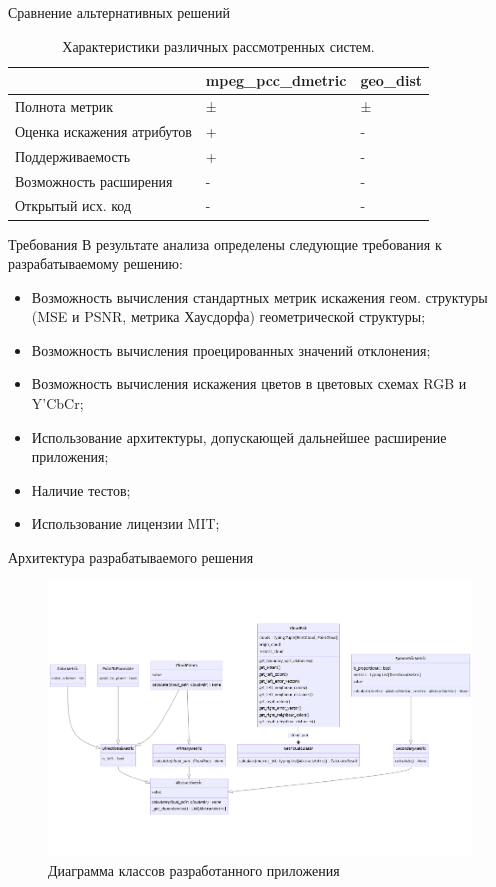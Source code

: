 \documentclass[aspectratio=169]{beamer}
\begin{document}
  \begin{frame}{Сравнение альтернативных решений}
    \begin{table}
      \begin{xltabular}{\linewidth}{|l|X|X|}
        \hline
        & mpeg\_pcc\_dmetric & geo\_dist \\
        \hline
        Полнота метрик & ± & ± \\
        \hline
        Оценка искажения атрибутов & + & - \\
        \hline
        Поддерживаемость & + & - \\
        \hline
        Возможность расширения & - & - \\
        \hline
        Открытый исх. код & - & - \\
        \hline
      \end{xltabular}
      \caption{
          Характеристики различных рассмотренных систем.
      }
    \end{table}
  \end{frame}

  \begin{frame}{Требования}
    В результате анализа определены следующие требования к разрабатываемому
    решению:

    \begin{itemize}
        \item Возможность вычисления стандартных метрик искажения геом. структуры (MSE и PSNR,
        метрика Хаусдорфа) геометрической структуры;
        \item Возможность вычисления проецированных значений отклонения;
        \item Возможность вычисления искажения цветов в цветовых схемах RGB и Y'CbCr;
        \item Использование архитектуры, допускающей дальнейшее расширение
        приложения;
        \item Наличие тестов;
        \item Использование лицензии MIT;
    \end{itemize}
  \end{frame}

  \begin{frame}{Архитектура разрабатываемого решения}
    \begin{figure}[H]
        \centering
        \includegraphics[width=0.7\linewidth]{assets/classes.png}
        \caption{Диаграмма классов разработанного приложения}
        \label{img:metric_classes}
    \end{figure}
  \end{frame}
\end{document}
